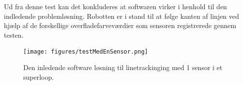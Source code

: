 Ud fra denne test kan det konkluderes at softwaren virker i henhold til den indledende problemløsning. Robotten er i stand til at følge kanten af linjen ved hjælp af de forskellige overfladefarveværdier som sensoren registrerede gennem testen. 
\newline

\begin{figure}[h!]
  \centering
  \texttt{[image: figures/testMedEnSensor.png]}
  \caption{Den inledende software løsning til linetrackinging med 1 sensor i et superloop.}
  \label{indledende_test}
\end{figure}
\newpage



 

